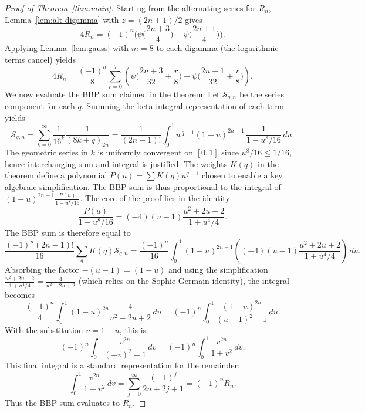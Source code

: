 \documentclass[11pt]{article}
\numberwithin{equation}{section}
\theoremstyle{plain}
\begin{document}
\begin{proof}[Proof of Theorem~\ref{thm:main}]
Starting from the alternating series for $R_n$, Lemma~\ref{lem:alt-digamma} with $z=(2n+1)/2$ gives 
\begin{equation}
4R_{n}=(-1)^{n}\Big(\psi\!\Big(\frac{2n+3}{4}\Big)-\psi\!\Big(\frac{2n+1}{4}\Big)\Big).\label{eq:Rn-digamma}
\end{equation}
Applying Lemma~\ref{lem:gauss} with $m=8$ to each digamma (the logarithmic terms cancel) yields
\begin{equation}
4R_{n}=\frac{(-1)^{n}}{8}\sum_{r=0}^{7}\left(\psi\!\Big(\frac{2n+3}{32}+\frac{r}{8}\Big)-\psi\!\Big(\frac{2n+1}{32}+\frac{r}{8}\Big)\right).\label{eq:Rn-avg}
\end{equation}
We now evaluate the BBP sum claimed in the theorem. Let $\mathcal{S}_{q,n}$ be the series component for each $q$. Summing the beta integral representation of each term yields
\begin{equation}
\mathcal{S}_{q,n} = \sum_{k=0}^{\infty}\frac{1}{16^{k}}\frac{1}{(8k+q)_{2n}} = \frac{1}{(2n-1)!}\int_{0}^{1}u^{\,q-1}(1-u)^{2n-1}\,\frac{1}{1-u^{8}/16}\,du.\label{eq:sum-to-integral}
\end{equation}
The geometric series in $k$ is uniformly convergent on $[0,1]$ since $u^8/16 \le 1/16$, hence interchanging sum and integral is justified. The weights $K(q)$ in the theorem define a polynomial $P(u)=\sum K(q)u^{q-1}$ chosen to enable a key algebraic simplification. The BBP sum is thus proportional to the integral of $(1-u)^{2n-1}\frac{P(u)}{1-u^{8}/16}$. The core of the proof lies in the identity
\[
\frac{P(u)}{1-u^{8}/16} = (-4)(u-1)\frac{u^{2}+2u+2}{1+u^{4}/4}.
\]
The BBP sum is therefore equal to
\[
\frac{(-1)^{n}(2n-1)!}{16}\sum_q K(q)\mathcal{S}_{q,n} = \frac{(-1)^n}{16}\int_0^1 (1-u)^{2n-1} \left( (-4)(u-1)\frac{u^{2}+2u+2}{1+u^{4}/4} \right) \,du.
\]
Absorbing the factor $-(u-1) = (1-u)$ and using the simplification $\frac{u^2+2u+2}{1+u^4/4} = \frac{4}{u^2-2u+2}$ (which relies on the Sophie Germain identity), the integral becomes
\[
\frac{(-1)^n}{4} \int_0^1 (1-u)^{2n} \frac{4}{u^2-2u+2} \,du = (-1)^n \int_0^1 \frac{(1-u)^{2n}}{(u-1)^2+1} \,du.
\]
With the substitution $v=1-u$, this is
\[
(-1)^n \int_0^1 \frac{v^{2n}}{(-v)^2+1} \,dv = (-1)^n \int_0^1 \frac{v^{2n}}{1+v^2} \,dv.
\]
This final integral is a standard representation for the remainder:
\[
\int_{0}^{1}\frac{v^{2n}}{1+v^2}\,dv=\sum_{j=0}^{\infty}\frac{(-1)^{j}}{2n+2j+1}=(-1)^{n}R_{n}.
\]
Thus the BBP sum evaluates to $R_n$.
\end{proof}
\end{document}
